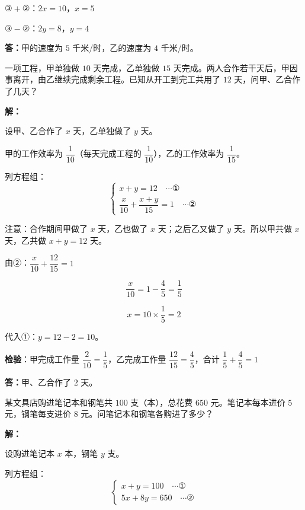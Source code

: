 \documentclass[12pt, a4paper]{ctexart}
\begin{document}
$③ + ②$：$2x = 10$，$x = 5$

$③ - ②$：$2y = 8$，$y = 4$

\textbf{答：}甲的速度为 $5$ 千米/时，乙的速度为 $4$ 千米/时。

\bigskip

\begin{appbox}[【应用2】工程问题]
一项工程，甲单独做 $10$ 天完成，乙单独做 $15$ 天完成。两人合作若干天后，甲因事离开，由乙继续完成剩余工程。已知从开工到完工共用了 $12$ 天，问甲、乙合作了几天？
\end{appbox}

\textbf{解：}

设甲、乙合作了 $x$ 天，乙单独做了 $y$ 天。

甲的工作效率为 $\dfrac{1}{10}$（每天完成工程的 $\dfrac{1}{10}$），乙的工作效率为 $\dfrac{1}{15}$。

列方程组：
$$\begin{cases} x + y = 12 \quad \cdots ① \\ \dfrac{x}{10} + \dfrac{x + y}{15} = 1 \quad \cdots ② \end{cases}$$

注意：合作期间甲做了 $x$ 天，乙也做了 $x$ 天；之后乙又做了 $y$ 天。所以甲共做 $x$ 天，乙共做 $x + y = 12$ 天。

由②：$\dfrac{x}{10} + \dfrac{12}{15} = 1$

$$\dfrac{x}{10} = 1 - \dfrac{4}{5} = \dfrac{1}{5}$$

$$x = 10 \times \dfrac{1}{5} = 2$$

代入①：$y = 12 - 2 = 10$。

\textbf{检验}：甲完成工作量 $\dfrac{2}{10} = \dfrac{1}{5}$，乙完成工作量 $\dfrac{12}{15} = \dfrac{4}{5}$，合计 $\dfrac{1}{5} + \dfrac{4}{5} = 1$ \quad \checkmark

\textbf{答：}甲、乙合作了 $2$ 天。

\bigskip

\begin{appbox}[【应用3】利润问题]
某文具店购进笔记本和钢笔共 $100$ 支（本），总花费 $650$ 元。笔记本每本进价 $5$ 元，钢笔每支进价 $8$ 元。问笔记本和钢笔各购进了多少？
\end{appbox}

\textbf{解：}

设购进笔记本 $x$ 本，钢笔 $y$ 支。

列方程组：
$$\begin{cases} x + y = 100 \quad \cdots ① \\ 5x + 8y = 650 \quad \cdots ② \end{cases}$$
\end{document}
